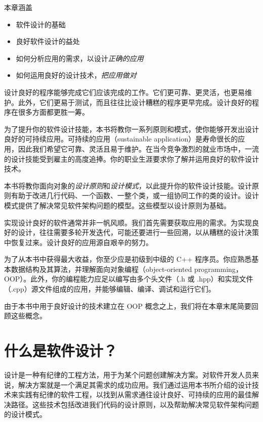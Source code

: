 \begin{myChapterIntro}{本章涵盖}
\begin{itemize}
\item 软件设计的基础
\item 良好软件设计的益处
\item 如何分析应用的需求，以设计\emph{正确的应用}
\item 如何运用良好的设计技术，\emph{把应用做对}
\end{itemize}
\end{myChapterIntro}

设计良好的程序能够完成它们应该完成的工作。它们更可靠、更灵活，也更易维护。此外，它们更易于测试，而且往往比设计糟糕的程序更早完成。设计良好的程序在很多方面都更胜一筹。

为了提升你的软件设计技能，本书将教你一系列原则和模式，使你能够开发出设计良好的可持续应用。可持续的应用（sustainable application）是寿命很长的应用，因此我们希望它可靠、灵活且易于维护。在当今竞争激烈的就业市场中，一流的设计技能受到雇主的高度追捧。你的职业生涯要求你了解并运用良好的软件设计技术。


本书将教你面向对象的\emph{设计原则}和\emph{设计模式}，以此提升你的软件设计技能。设计原则有助于改进几行代码、一个函数、一整个类，或一组协同工作的类的设计。设计模式提供了解决常见软件架构问题的模型。这些模型以设计原则为基础。

实现设计良好的软件通常并非一帆风顺。我们首先需要获取应用的需求。为实现良好的设计，往往需要多轮开发迭代，可能还要进行一些回溯，以从糟糕的设计决策中恢复过来。设计良好的应用源自艰辛的努力。

为了从本书中获得最大收益，你至少应是初级到中级的 C++ 程序员。你应熟悉基本数据结构及其算法，并理解面向对象编程（object-oriented programming，OOP）。此外，你的编程能力应足以编写由多个头文件（.h 或 .hpp）和实现文件（.cpp）源文件组成的应用，并能够编辑、编译、调试和运行它们。

由于本书中用于良好设计的技术建立在 OOP 概念之上，我们将在本章末尾简要回顾这些概念。

\section{什么是软件设计？}

设计是一种有纪律的工程方法，用于为某个问题创建解决方案。对软件开发人员来说，解决方案就是一个满足其需求的成功应用。我们通过运用本书所介绍的设计技术来实践有纪律的软件工程，以找到从需求通往设计良好、可持续的应用的最佳解决路径。这些技术包括改进我们代码的设计原则，以及帮助解决常见软件架构问题的设计模式。

